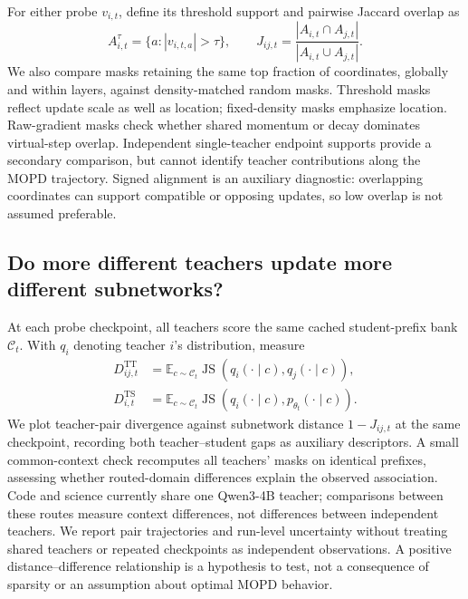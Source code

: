 For either probe $v_{i,t}$, define its threshold support and pairwise
Jaccard overlap as
\begin{equation}
 A_{i,t}^{\tau}=\{a:|v_{i,t,a}|>\tau\},\qquad
 J_{ij,t}=\frac{|A_{i,t}\cap A_{j,t}|}{|A_{i,t}\cup A_{j,t}|}.
 \label{subnet_overlap}
\end{equation}
We also compare masks retaining the same top fraction of coordinates,
globally and within layers, against density-matched random masks.
Threshold masks reflect update scale as well as location; fixed-density
masks emphasize location. Raw-gradient masks check whether shared momentum
or decay dominates virtual-step overlap. Independent single-teacher
endpoint supports provide a secondary comparison, but cannot identify
teacher contributions along the MOPD trajectory. Signed alignment is an
auxiliary diagnostic: overlapping coordinates can support compatible or
opposing updates, so low overlap is not assumed preferable.

\subsection{Do more different teachers update more different subnetworks?}

At each probe checkpoint, all teachers score the same cached student-prefix
bank $\mathcal C_t$. With $q_i$ denoting teacher $i$'s distribution, measure
\begin{equation}
\begin{aligned}
 D_{ij,t}^{\mathrm{TT}}&=\mathbb E_{c\sim\mathcal C_t}
          \operatorname{JS}(q_i(\cdot\mid c),q_j(\cdot\mid c)),\\
 D_{i,t}^{\mathrm{TS}}&=\mathbb E_{c\sim\mathcal C_t}
          \operatorname{JS}(q_i(\cdot\mid c),p_{\theta_t}(\cdot\mid c)).
\end{aligned}
\label{subnet_distances}
\end{equation}
We plot teacher-pair divergence against subnetwork distance $1-J_{ij,t}$
at the same checkpoint, recording both teacher--student gaps as auxiliary
descriptors. A small common-context check recomputes all teachers' masks
on identical prefixes, assessing whether routed-domain differences explain
the observed association. Code and science currently share one Qwen3-4B
teacher; comparisons between these routes measure context differences,
not differences between independent teachers. We report pair trajectories
and run-level uncertainty without treating shared teachers or repeated
checkpoints as independent observations. A positive distance--difference
relationship is a hypothesis to test, not a consequence of sparsity or an
assumption about optimal MOPD behavior.
